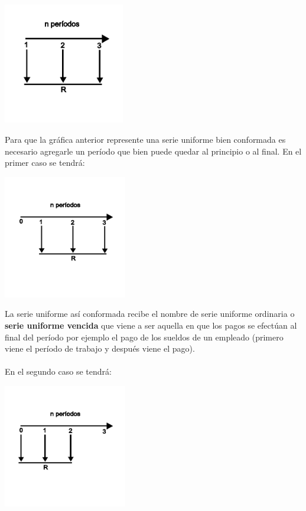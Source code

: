 	\begin{center}
		\includegraphics[height=5.3cm]{4_Capitulo/img/ejemplos/4_3.pdf}
	\end{center}

	Para que la gráfica anterior represente una serie uniforme bien conformada es necesario agregarle un período que bien puede quedar al principio o al final. En el primer caso se tendrá:

	\begin{center}
		\includegraphics[height=5.4cm]{4_Capitulo/img/ejemplos/4_4.pdf}
	\end{center}

	La serie uniforme así conformada recibe el nombre de serie uniforme ordinaria o \textbf{serie uniforme vencida} que viene a ser aquella en que los pagos se efectúan al final del período por ejemplo el pago de los sueldos de un empleado (primero viene el período de trabajo y después viene el pago).
	\\\\
	En el segundo caso se tendrá:

	\begin{center}
		\includegraphics[height=5.4cm]{4_Capitulo/img/ejemplos/4_5.pdf}
	\end{center}

